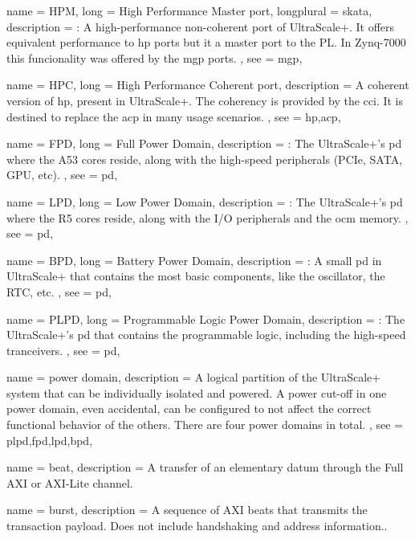 {
	name = {HPM},
	long = {High Performance Master port},
	longplural = {skata},
	description = {\emph{}:
		A high-performance non-coherent port of UltraScale+. 
		It offers equivalent performance to \gls{hp} ports but it a master port to the PL.
		In Zynq-7000 this funcionality was offered by the \gls{mgp} ports.
	},
	see = {mgp},
}

{
	name = {HPC},
	long = {High Performance Coherent port},
	description = {
		A coherent version of \gls{hp}, present in UltraScale+.
		The coherency is provided by the \gls{cci}.
		It is destined to replace the \gls{acp} in many usage scenarios.
	},
	see = {hp,acp},
}


{
	name = {FPD},
	long = {Full Power Domain},
	description = {\emph{}:
		The UltraScale+'s \gls{pd} where the A53 cores reside,
		along with the high-speed peripherals (PCIe, SATA, GPU, etc).
	},
	see = {pd},
}

{
	name = {LPD},
	long = {Low Power Domain},
	description = {\emph{}:
		The UltraScale+'s \gls{pd} where the R5 cores reside,
		along with the I/O peripherals and the \gls{ocm} memory.
	},
	see = {pd},
}

{
	name = {BPD},
	long = {Battery Power Domain},
	description = {\emph{}:
		A small \gls{pd} in UltraScale+ 
		that contains the most basic components,
		like the oscillator, the RTC, etc.
	},
	see = {pd},
}

{
	name = {PLPD},
	long = {Programmable Logic Power Domain},
	description = {\emph{}:
		The UltraScale+'s \gls{pd} that contains the
		programmable logic, including
		the high-speed tranceivers.
	},
	see = {pd},
}


{
	name = {power domain},
	description = {
		A logical partition of the UltraScale+ system that 
		can be individually isolated and powered.
		A power cut-off in one power domain, even accidental,
		can be configured to not affect the correct functional behavior
		of the others.
		There are four power domains in total.
	},
	see = {plpd,fpd,lpd,bpd},
}

{
	name = {beat},
	description = {A transfer of an elementary datum through the Full AXI or AXI-Lite channel.}
}

{
	name = {burst},
	description = {A sequence of AXI \Glspl{beat} that transmits the \gls{transaction} payload.
	Does not include handshaking and address information.}.
}

